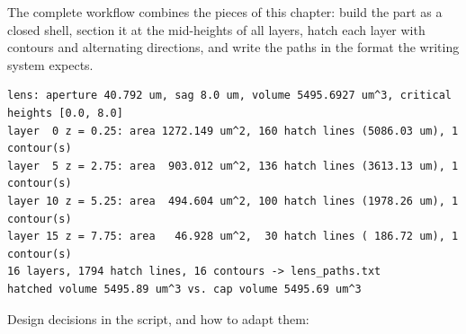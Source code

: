 The complete workflow combines the pieces of this chapter: build the part as a closed shell,
section it at the mid-heights of all layers, hatch each layer with contours and alternating
directions, and write the paths in the format the writing system expects.


\begin{lstlisting}[style=text]
lens: aperture 40.792 um, sag 8.0 um, volume 5495.6927 um^3, critical heights [0.0, 8.0]
layer  0 z = 0.25: area 1272.149 um^2, 160 hatch lines (5086.03 um), 1 contour(s)
layer  5 z = 2.75: area  903.012 um^2, 136 hatch lines (3613.13 um), 1 contour(s)
layer 10 z = 5.25: area  494.604 um^2, 100 hatch lines (1978.26 um), 1 contour(s)
layer 15 z = 7.75: area   46.928 um^2,  30 hatch lines ( 186.72 um), 1 contour(s)
16 layers, 1794 hatch lines, 16 contours -> lens_paths.txt
hatched volume 5495.89 um^3 vs. cap volume 5495.69 um^3
\end{lstlisting}

Design decisions in the script, and how to adapt them:

